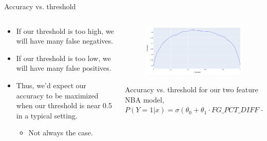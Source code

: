 \documentclass[aspectratio=169]{../latex_main/tntbeamer}  %
\begin{document}
	
	\begin{frame}{Accuracy vs. threshold}
	    \begin{columns}
	        \begin{column}{.5\textwidth}
	             \begin{itemize}
	                 \item If our threshold is too high, we will have many false negatives.
	                 \item If our threshold is too low, we will have many false positives.
	                 \item Thus, we’d expect our accuracy to be maximized when our threshold is near 0.5 in a typical setting.
	                 \begin{itemize}
	                     \item Not always the case.
	                 \end{itemize}
	             \end{itemize}   
	        \end{column}
	        
	        
	        \begin{column}{.5\textwidth}
	                \begin{figure}
	                    \centering
	                    \includegraphics[scale=.6]{Bild17}
	                \end{figure}
	                Accuracy vs. threshold for our two feature NBA model, $ P(Y=1|x) = \sigma (\theta_0  + \theta_1 \cdot FG\_PCT\_DIFF + \theta_2 \cdot PF\_DIFF)$
	        \end{column}
	        
	    \end{columns}
	\end{frame}
	
	
	
\end{document}

